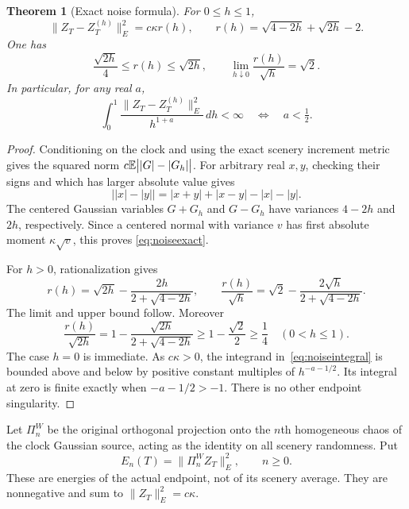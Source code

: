 \documentclass[11pt]{article}
\newtheorem{theorem}{Theorem}[section]
\begin{document}
\begin{theorem}[Exact noise formula]\label{thm:noise}
For $0\leq h\leq1$,
\begin{equation}\label{eq:noiseexact}
 \|Z_T-Z_T^{(h)}\|_E^2
  =c\kappa r(h),\qquad
 r(h)=\sqrt{4-2h}+\sqrt{2h}-2.
\end{equation}
One has
\begin{equation}\label{eq:noisebounds}
 \frac{\sqrt{2h}}4\leq r(h)\leq\sqrt{2h},\qquad
 \lim_{h\downarrow0}\frac{r(h)}{\sqrt h}=\sqrt2.
\end{equation}
In particular, for any real $a$,
\begin{equation}\label{eq:noiseintegral}
 \int_0^1\frac{\|Z_T-Z_T^{(h)}\|_E^2}{h^{1+a}}\,dh<\infty
 \quad\Longleftrightarrow\quad a<\tfrac12.
\end{equation}
\end{theorem}
\begin{proof}
Conditioning on the clock and using the exact scenery increment metric
gives the squared norm $c\mathbb E\bigl||G|-|G_h|\bigr|$.
For arbitrary real $x,y$, checking their signs and which has larger
absolute value gives
\[
 \bigl||x|-|y|\bigr|=|x+y|+|x-y|-|x|-|y|.
\]
The centered Gaussian variables $G+G_h$ and $G-G_h$ have variances
$4-2h$ and $2h$, respectively. Since a centered normal with variance
$v$ has first absolute moment $\kappa\sqrt v$, this proves
\eqref{eq:noiseexact}.

For $h>0$, rationalization gives
\[
 r(h)=\sqrt{2h}-\frac{2h}{2+\sqrt{4-2h}},\qquad
 \frac{r(h)}{\sqrt h}
   =\sqrt2-\frac{2\sqrt h}{2+\sqrt{4-2h}}.
\]
The limit and upper bound follow. Moreover
\[
 \frac{r(h)}{\sqrt{2h}}
  =1-\frac{\sqrt{2h}}{2+\sqrt{4-2h}}
  \geq1-\frac{\sqrt2}{2}\geq\frac14
 \quad(0<h\leq1).
\]
The case $h=0$ is immediate. As $c\kappa>0$, the integrand
in~\eqref{eq:noiseintegral} is bounded above and below by positive
constant multiples of $h^{-a-1/2}$. Its integral at zero is finite
exactly when $-a-1/2>-1$. There is no other endpoint singularity.
\end{proof}

Let $\Pi_n^W$ be the original orthogonal projection onto the $n$th
homogeneous chaos of the clock Gaussian source, acting as the identity
on all scenery randomness. Put
\[
 E_n(T)=\|\Pi_n^W Z_T\|_E^2,\qquad n\geq0.
\]
These are energies of the actual endpoint, not of its scenery average.
They are nonnegative and sum to $\|Z_T\|_E^2=c\kappa$.
\end{document}
